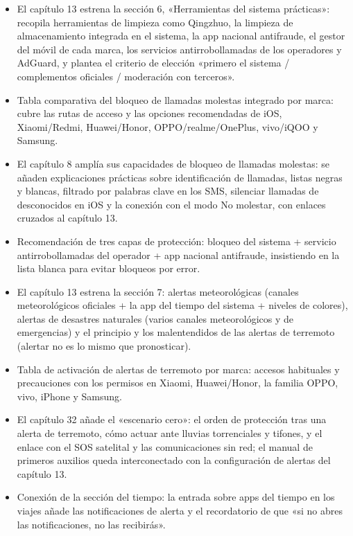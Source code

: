 
\begin{itemize}
  \item El capítulo 13 estrena la sección 6, «Herramientas del sistema prácticas»: recopila herramientas de limpieza como Qingzhuo, la limpieza de almacenamiento integrada en el sistema, la app nacional antifraude, el gestor del móvil de cada marca, los servicios antirrobollamadas de los operadores y AdGuard, y plantea el criterio de elección «primero el sistema / complementos oficiales / moderación con terceros».
  \item Tabla comparativa del bloqueo de llamadas molestas integrado por marca: cubre las rutas de acceso y las opciones recomendadas de iOS, Xiaomi/Redmi, Huawei/Honor, OPPO/realme/OnePlus, vivo/iQOO y Samsung.
  \item El capítulo 8 amplía sus capacidades de bloqueo de llamadas molestas: se añaden explicaciones prácticas sobre identificación de llamadas, listas negras y blancas, filtrado por palabras clave en los SMS, silenciar llamadas de desconocidos en iOS y la conexión con el modo No molestar, con enlaces cruzados al capítulo 13.
  \item Recomendación de tres capas de protección: bloqueo del sistema + servicio antirrobollamadas del operador + app nacional antifraude, insistiendo en la lista blanca para evitar bloqueos por error.
\end{itemize}


\begin{itemize}
  \item El capítulo 13 estrena la sección 7: alertas meteorológicas (canales meteorológicos oficiales + la app del tiempo del sistema + niveles de colores), alertas de desastres naturales (varios canales meteorológicos y de emergencias) y el principio y los malentendidos de las alertas de terremoto (alertar no es lo mismo que pronosticar).
  \item Tabla de activación de alertas de terremoto por marca: accesos habituales y precauciones con los permisos en Xiaomi, Huawei/Honor, la familia OPPO, vivo, iPhone y Samsung.
  \item El capítulo 32 añade el «escenario cero»: el orden de protección tras una alerta de terremoto, cómo actuar ante lluvias torrenciales y tifones, y el enlace con el SOS satelital y las comunicaciones sin red; el manual de primeros auxilios queda interconectado con la configuración de alertas del capítulo 13.
  \item Conexión de la sección del tiempo: la entrada sobre apps del tiempo en los viajes añade las notificaciones de alerta y el recordatorio de que «si no abres las notificaciones, no las recibirás».
\end{itemize}

